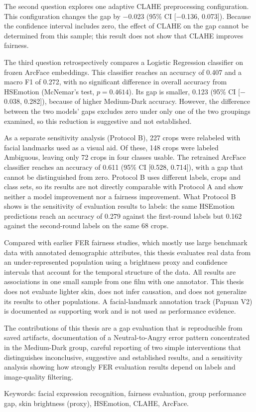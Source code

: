The second question explores one adaptive CLAHE preprocessing configuration. This configuration changes the gap by $-$0.023 (95\% CI [$-$0.136, 0.073]). Because the confidence interval includes zero, the effect of CLAHE on the gap cannot be determined from this sample; this result does not show that CLAHE improves fairness.

The third question retrospectively compares a Logistic Regression classifier on frozen ArcFace embeddings. This classifier reaches an accuracy of 0.407 and a macro F1 of 0.272, with no significant difference in overall accuracy from HSEmotion (McNemar's test, $p = 0.4614$). Its gap is smaller, 0.123 (95\% CI [$-$0.038, 0.282]), because of higher Medium-Dark accuracy. However, the difference between the two models' gaps excludes zero under only one of the two groupings examined, so this reduction is suggestive and not established.

As a separate sensitivity analysis (Protocol B), 227 crops were relabeled with facial landmarks used as a visual aid. Of these, 148 crops were labeled Ambiguous, leaving only 72 crops in four classes usable. The retrained ArcFace classifier reaches an accuracy of 0.611 (95\% CI [0.528, 0.714]), with a gap that cannot be distinguished from zero. Protocol B uses different labels, crops and class sets, so its results are not directly comparable with Protocol A and show neither a model improvement nor a fairness improvement. What Protocol B shows is the sensitivity of evaluation results to labels: the same HSEmotion predictions reach an accuracy of 0.279 against the first-round labels but 0.162 against the second-round labels on the same 68 crops.

Compared with earlier FER fairness studies, which mostly use large benchmark data with annotated demographic attributes, this thesis evaluates real data from an under-represented population using a brightness proxy and confidence intervals that account for the temporal structure of the data. All results are associations in one small sample from one film with one annotator. This thesis does not evaluate lighter skin, does not infer causation, and does not generalize its results to other populations. A facial-landmark annotation track (Papuan V2) is documented as supporting work and is not used as performance evidence.

The contributions of this thesis are a gap evaluation that is reproducible from saved artifacts, documentation of a Neutral-to-Angry error pattern concentrated in the Medium-Dark group, careful reporting of two simple interventions that distinguishes inconclusive, suggestive and established results, and a sensitivity analysis showing how strongly FER evaluation results depend on labels and image-quality filtering.

\vspace{2\baselineskip}
\upshape
Keywords: facial expression recognition, fairness evaluation, group performance gap, skin brightness (proxy), HSEmotion, CLAHE, ArcFace.
